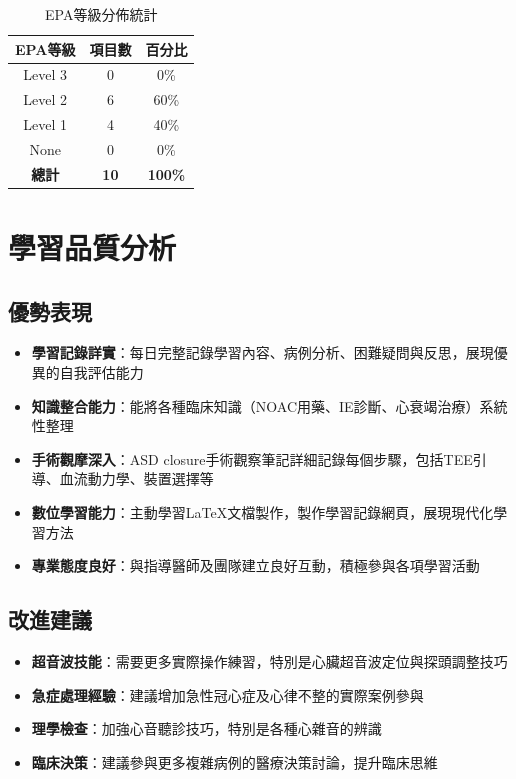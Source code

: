 \documentclass[12pt,a4paper]{article}
\begin{document}
\begin{table}[h]
\centering
\caption{EPA等級分佈統計}
\begin{tabular}{|c|c|c|}
\hline
\textbf{EPA等級} & \textbf{項目數} & \textbf{百分比} \\
\hline
Level 3 & 0 & 0\% \\
Level 2 & 6 & 60\% \\
Level 1 & 4 & 40\% \\
None & 0 & 0\% \\
\hline
\textbf{總計} & \textbf{10} & \textbf{100\%} \\
\hline
\end{tabular}
\end{table}

\section{學習品質分析}

\subsection{優勢表現}

\begin{itemize}
\item \textbf{學習記錄詳實}：每日完整記錄學習內容、病例分析、困難疑問與反思，展現優異的自我評估能力
\item \textbf{知識整合能力}：能將各種臨床知識（NOAC用藥、IE診斷、心衰竭治療）系統性整理
\item \textbf{手術觀摩深入}：ASD closure手術觀察筆記詳細記錄每個步驟，包括TEE引導、血流動力學、裝置選擇等
\item \textbf{數位學習能力}：主動學習LaTeX文檔製作，製作學習記錄網頁，展現現代化學習方法
\item \textbf{專業態度良好}：與指導醫師及團隊建立良好互動，積極參與各項學習活動
\end{itemize}

\subsection{改進建議}

\begin{itemize}
\item \textbf{超音波技能}：需要更多實際操作練習，特別是心臟超音波定位與探頭調整技巧
\item \textbf{急症處理經驗}：建議增加急性冠心症及心律不整的實際案例參與
\item \textbf{理學檢查}：加強心音聽診技巧，特別是各種心雜音的辨識
\item \textbf{臨床決策}：建議參與更多複雜病例的醫療決策討論，提升臨床思維
\end{itemize}
\end{document}

